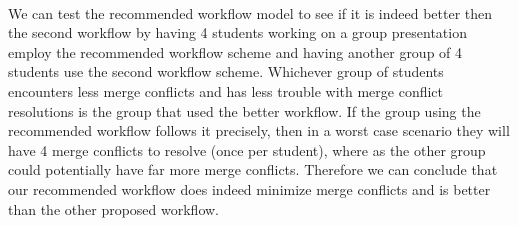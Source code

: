 \documentclass[12pt]{article}
\begin{document}
\paragraph{} We can test the recommended workflow model to see if it is indeed better then the second workflow by  having 4 students working on a group presentation employ the recommended workflow scheme and having another group of 4 students use the second workflow scheme. Whichever group of students encounters less merge conflicts and has less trouble with merge conflict resolutions is the group that used the better workflow. If the group using the recommended workflow follows it precisely, then in a worst case scenario they will have 4 merge conflicts to resolve (once per student), where as the other group could potentially have far more merge conflicts. Therefore we can conclude that our recommended workflow does indeed minimize merge conflicts and is better than the other proposed workflow. 
\end{document}
